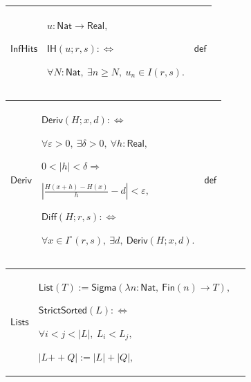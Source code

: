\documentclass[11pt]{amsart}
\newlength{\FTCThreeColumnBody}
\begin{document}
{\noindent
\begin{tabular}{|@{}>{\centering\arraybackslash}m{0.251968\FTCThreeColumnBody}|>{\centering\arraybackslash}m{0.590551\FTCThreeColumnBody}|>{\centering\arraybackslash}m{0.157480\FTCThreeColumnBody}|}\hline
\hypertarget{def:InfHits}{$\displaystyle \textsf{InfHits}$} & $\displaystyle u:\textsf{Nat}\to\textsf{Real},$\par
$\displaystyle \textsf{IH}(u;r,s):\Longleftrightarrow$\par
$\displaystyle \forall N:\textsf{Nat},\ \exists n\ge N,\ u_n\in I(r,s).$ & $\displaystyle \textsf{def}$\\ \hline
\end{tabular}%
\par\setlength{\parskip}{0pt}\nointerlineskip
\noindent
\begin{tabular}{|@{}>{\centering\arraybackslash}m{0.251968\FTCThreeColumnBody}|>{\centering\arraybackslash}m{0.590551\FTCThreeColumnBody}|>{\centering\arraybackslash}m{0.157480\FTCThreeColumnBody}|}\hline
\hypertarget{def:Deriv}{$\displaystyle \textsf{Deriv}$} & $\displaystyle \textsf{Deriv}(H;x,d):\Longleftrightarrow$\par
$\displaystyle \forall\varepsilon>0,\ \exists\delta>0,\ \forall h:\textsf{Real},$\par
$\displaystyle 0<|h|<\delta\Rightarrow$\par
$\displaystyle \left|\frac{H(x+h)-H(x)}h-d\right|<\varepsilon,$\par
$\displaystyle \textsf{Diff}(H;r,s):\Longleftrightarrow$\par
$\displaystyle \forall x\in I^\circ(r,s),\ \exists d,\ \textsf{Deriv}(H;x,d).$ & $\displaystyle \textsf{def}$\\ \hline
\end{tabular}%
\par\setlength{\parskip}{0pt}\nointerlineskip
\noindent
\begin{tabular}{|@{}>{\centering\arraybackslash}m{0.251968\FTCThreeColumnBody}|>{\centering\arraybackslash}m{0.590551\FTCThreeColumnBody}|>{\centering\arraybackslash}m{0.157480\FTCThreeColumnBody}|}\hline
\hypertarget{def:Lists}{$\displaystyle \textsf{Lists}$} & $\displaystyle \textsf{List}(T):=\textsf{Sigma}(\lambda n:\textsf{Nat},\ \textsf{Fin}(n)\to T),$\par
$\displaystyle \textsf{StrictSorted}(L):\Longleftrightarrow$\par
$\displaystyle \forall i<j<|L|,\ L_i<L_j,$\par
$\displaystyle |L\mathbin{+\!\!+}Q|:=|L|+|Q|,$\par

\end{tabular}}
\end{document}
